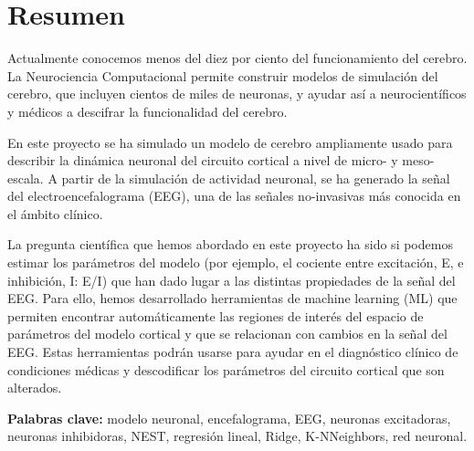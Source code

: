 \chapter*{Resumen}


Actualmente conocemos menos del diez por ciento del funcionamiento del cerebro. La Neurociencia Computacional permite construir modelos de simulación del cerebro, que incluyen cientos de miles de neuronas, y ayudar así a neurocientíficos y médicos a descifrar la funcionalidad del cerebro. 

En este proyecto se ha simulado un modelo de cerebro ampliamente usado para describir la dinámica neuronal del circuito cortical a nivel de micro- y meso-escala. A partir de la simulación de actividad neuronal, se ha generado la señal del electroencefalograma (EEG), una de las señales no-invasivas más conocida en el ámbito clínico. 

La pregunta científica que hemos abordado en este proyecto ha sido si podemos estimar los parámetros del modelo (por ejemplo, el cociente entre excitación, E, e inhibición, I: E/I) que han dado lugar a las distintas propiedades de la señal del EEG. Para ello, hemos desarrollado herramientas de machine learning (ML) que permiten encontrar automáticamente las regiones de interés del espacio de parámetros del modelo cortical y que se relacionan con cambios en la señal del EEG. Estas herramientas podrán usarse para ayudar en el diagnóstico clínico de condiciones médicas y descodificar los parámetros del circuito cortical que son alterados.

\textbf{Palabras clave:} modelo neuronal, encefalograma, EEG, neuronas excitadoras, neuronas inhibidoras, NEST, regresión lineal, Ridge, K-NNeighbors, red neuronal.